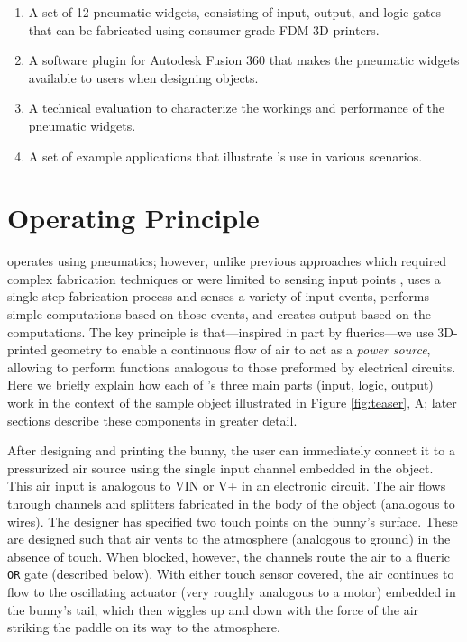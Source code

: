     \begin{enumerate}
      \item A set of 12 pneumatic widgets, consisting of input, output, and
        logic gates that can be fabricated using consumer-grade FDM
        3D-printers.
      \item A software plugin for Autodesk Fusion 360 that makes the
          pneumatic widgets available to users when designing
        \al objects.
      \item A technical evaluation to characterize the workings and
        performance of the pneumatic widgets.
      \item A set of example applications that illustrate \al's use
        in various scenarios.
    \end{enumerate}
    
  \section{\al Operating Principle}
    \al operates using pneumatics; however, unlike previous approaches
    which required complex fabrication techniques
    \cite{He:2017,Vazquez:2015,Slyper:2012} or were limited to sensing
    input points \cite{Tejada:2018, Tejada:2020}, \al uses a single-step
    fabrication process and senses a variety of input events, performs
    simple computations based on those events, and creates output based on
    the computations. The key principle is that---inspired in part by
    fluerics---we use 3D-printed geometry to enable a continuous flow of
    air to act as a \textit{power source}, allowing \al to perform
    functions analogous to those preformed by electrical circuits. Here we
    briefly explain how each of \al's three main parts (input, logic,
    output) work in the context of the sample object illustrated in
    Figure \ref{fig:teaser}, A; later sections describe these components in
    greater detail.

    After designing and printing the bunny, the user can immediately
    connect it to a pressurized air source using the single input channel
    embedded in the object. This air input is analogous to VIN or V+ in an
    electronic circuit. The air flows through channels and splitters
    fabricated in the body of the object (analogous to wires). The designer
    has specified two touch points on the bunny's surface. These are
    designed such that air vents to the atmosphere (analogous to ground) in
    the absence of touch. When blocked, however, the channels route the air
    to a flueric \texttt{OR} gate (described below). With either touch
    sensor covered, the air continues to flow to the oscillating actuator
    (very roughly analogous to a motor) embedded in the bunny's tail, which
    then wiggles up and down with the force of the air striking the paddle
    on its way to the atmosphere.

